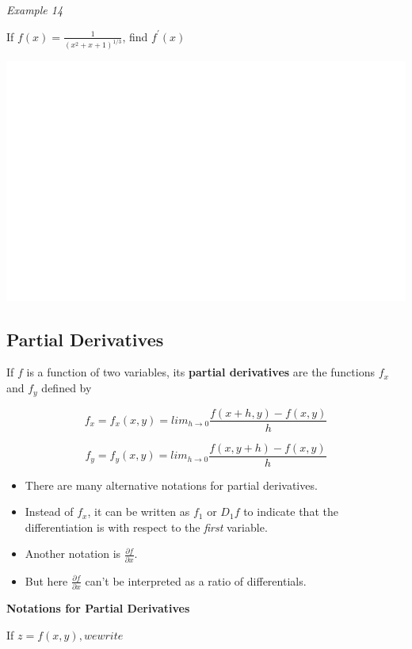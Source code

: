 \documentclass[]{book}
\begin{document}
\emph{Example 14}

If \(f(x)=\frac{1}{(x^2+x+1)^{1/3}}\), find \(f^\prime(x)\)

\begin{center}\includegraphics[width=1\linewidth]{figure/LB25-1} \end{center}

\hypertarget{partial-derivatives}{%
\subsection{Partial Derivatives}\label{partial-derivatives}}

If \(f\) is a function of two variables, its \textbf{partial derivatives} are the functions \(f_x\) and \(f_y\) defined by

\[f_x=f_x(x,y)=lim_{h\to 0}\frac{f(x+h,y)-f(x,y)}{h}\]

\[f_y=f_y(x,y)=lim_{h\to 0}\frac{f(x,y+h)-f(x,y)}{h}\]

\begin{itemize}
\item
  There are many alternative notations for partial derivatives.
\item
  Instead of \(f_x\), it can be written as \(f_1\) or \(D_1f\) to indicate that the differentiation is with respect to the \emph{first} variable.
\item
  Another notation is \(\frac{\partial f}{\partial x}\).
\item
  But here \(\frac{\partial f}{\partial x}\) can't be interpreted as a ratio of differentials.
\end{itemize}

\textbf{Notations for Partial Derivatives}

If \(z=f(x,y), we write\)
\end{document}
